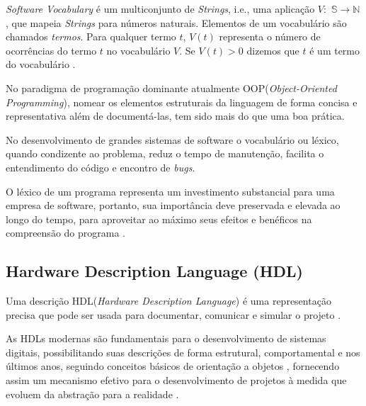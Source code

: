 \documentclass[12pt, twocolumn, a4paper]{article}
\begin{document}
 \textit{Software Vocabulary} é um multiconjunto de \textit{Strings}, i.e., uma aplicação $V:$ $\mathbb{S}\rightarrow\mathbb{N}$, que mapeia \textit{Strings} para números naturais. Elementos de um vocabulário são chamados \textit{termos}. Para qualquer termo $t$, $V(t)$ representa o número de ocorrências do termo $t$ no vocabulário $V$. Se $V(t)>0$ dizemos que $t$ é um termo do vocabulário \cite{Santos2015}.


No paradigma de programação dominante atualmente OOP(\textit{Object-Oriented Programming}), nomear os elementos estruturais da linguagem de forma concisa e representativa além de documentá-las, tem sido mais do que uma boa prática.

 No desenvolvimento de grandes sistemas de software o vocabulário ou léxico, quando condizente ao problema, reduz o tempo de manutenção, facilita o entendimento do código e encontro de \textit{bugs}.

O léxico de um programa representa um investimento substancial para uma empresa de software, portanto, sua importância deve preservada e elevada ao longo do tempo, para aproveitar ao máximo seus efeitos e benéficos na compreensão do programa \cite{Antoniol2007}.

	\subsection{Hardware Description Language (HDL)}

\quad Uma descrição HDL(\textit{Hardware Description Language}) é uma representação precisa que pode ser usada para documentar, comunicar e simular o projeto \cite{Miller-Karlow}.

As HDLs modernas são fundamentais para o desenvolvimento de sistemas digitais, possibilitando suas descrições de forma estrutural, comportamental e nos últimos anos, seguindo conceitos básicos de orientação a objetos \cite{Hahanov2008}, fornecendo assim um mecanismo efetivo para o desenvolvimento de projetos à medida que evoluem da abstração para a realidade \cite{Navabi2015}.
\end{document}
